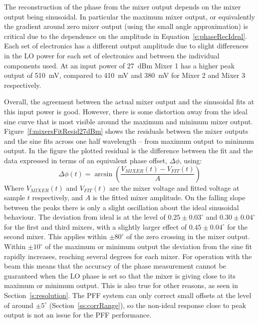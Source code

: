 The reconstruction of the phase from the mixer output depends on the mixer output being sinusoidal. In particular the maximum mixer output, or equivalently the gradient around zero mixer output (using the small angle approximation) is critical due to the dependence on the amplitude in Equation~\ref{e:phaseRecIdeal}. Each set of electronics has a different output amplitude due to slight differences in the LO power for each set of electronics and between the individual components used. At an input power of 27~dBm Mixer 1 has a higher peak output of 510~mV, compared to 410~mV and 380~mV for Mixer 2 and Mixer 3 respectively. 

Overall, the agreement between the actual mixer output and the sinusoidal fits at this input power is good. However, there is some distortion away from the ideal sine curve that is most visible around the maximum and minimum mixer output. Figure~\ref{f:mixersFitResid27dBm} shows the residuals between the mixer outputs and the sine fits across one half wavelength -- from maximum output to minimum output. In the figure the plotted residual is the difference between the fit and the data expressed in terms of an equivalent phase offset, \(\Delta \phi\), using:
\begin{equation}
\Delta \phi(t) = \arcsin\left(\frac{V_{MIXER}(t)-V_{FIT}(t)}{A}\right)
\end{equation}
Where \(V_{MIXER}(t)\) and \(V_{FIT}(t)\) are the mixer voltage and fitted voltage at sample \(t\) respectively, and \(A\) is the fitted mixer amplitude. On the falling slope between the peaks there is only a slight oscillation about the ideal sinusoidal behaviour. The deviation from ideal is at the level of \(0.25\pm0.03^\circ\) and \(0.30\pm0.04^\circ\) for the first and third mixers, with a slightly larger effect of \(0.45\pm0.04^\circ\) for the second mixer. This applies within \(\pm80^\circ\) of the zero crossing in the mixer output. Within \(\pm10^\circ\) of the maximum or minimum output the deviation from the sine fit rapidly increases, reaching several degrees for each mixer. For operation with the beam this means that the accuracy of the phase measurement cannot be guaranteed when the LO phase is set so that the mixer is giving close to its maximum or minimum output. This is also true for other reasons, as seen in Section~\ref{s:resolution}. The PFF system can only correct small offsets at the level of around \(\pm5^\circ\) (Section~\ref{ss:corrRange}), so the non-ideal response close to peak output is not an issue for the PFF performance.

